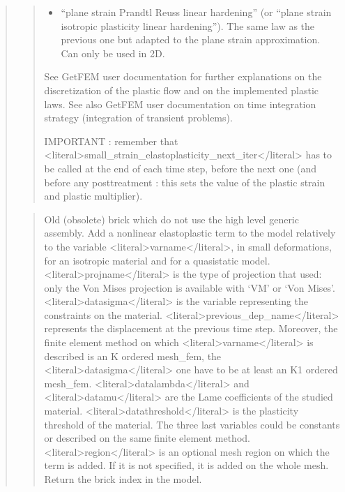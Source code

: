 \documentclass[a4paper,11pt,english]{sphinxmanual}
\begin{document}
\begin{quote}
\begin{quote}
\begin{itemize}
\item {} 
\sphinxAtStartPar
“plane strain Prandtl Reuss linear hardening”
(or “plane strain isotropic plasticity linear hardening”).
The same law as the previous one but adapted to the plane strain
approximation. Can only be used in 2D.

\end{itemize}

\sphinxAtStartPar
See GetFEM user documentation for further explanations on the
discretization of the plastic flow and on the implemented plastic laws.
See also GetFEM user documentation on time integration strategy
(integration of transient problems).

\sphinxAtStartPar
IMPORTANT : remember that \textless{}literal\textgreater{}small\_strain\_elastoplasticity\_next\_iter\textless{}/literal\textgreater{} has
to be called at the end of each time step, before the next one
(and before any post\sphinxhyphen{}treatment : this sets the value of the plastic
strain and plastic multiplier).
\end{quote}

\sphinxAtStartPar
{}
\begin{quote}

\sphinxAtStartPar
Old (obsolete) brick which do not use the high level generic
assembly. Add a nonlinear elastoplastic term to the model relatively
to the variable \textless{}literal\textgreater{}varname\textless{}/literal\textgreater{}, in small deformations, for an isotropic
material and for a quasistatic model. \textless{}literal\textgreater{}projname\textless{}/literal\textgreater{} is the type of
projection that used: only the Von Mises projection is
available with ‘VM’ or ‘Von Mises’.
\textless{}literal\textgreater{}datasigma\textless{}/literal\textgreater{} is the variable representing the constraints on the material.
\textless{}literal\textgreater{}previous\_dep\_name\textless{}/literal\textgreater{} represents the displacement at the previous time step.
Moreover, the finite element method on which \textless{}literal\textgreater{}varname\textless{}/literal\textgreater{} is described
is an K ordered mesh\_fem, the \textless{}literal\textgreater{}datasigma\textless{}/literal\textgreater{} one have to be at least
an K\sphinxhyphen{}1 ordered mesh\_fem.
\textless{}literal\textgreater{}datalambda\textless{}/literal\textgreater{} and \textless{}literal\textgreater{}datamu\textless{}/literal\textgreater{} are the Lame coefficients of the studied
material.
\textless{}literal\textgreater{}datathreshold\textless{}/literal\textgreater{} is the plasticity threshold of the material.
The three last variables could be constants or described on the
same finite element method.
\textless{}literal\textgreater{}region\textless{}/literal\textgreater{} is an optional mesh region on which the term is added.
If it is not specified, it is added on the whole mesh.
Return the brick index in the model.
\end{quote}


\end{quote}
\end{document}
